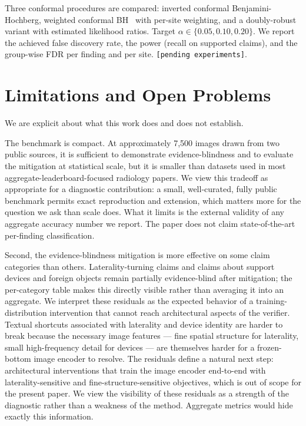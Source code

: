 \documentclass[11pt]{article}
\begin{document}
Three conformal procedures are compared: inverted conformal Benjamini-Hochberg, weighted conformal BH~\cite{tibshirani2019conformal} with per-site weighting, and a doubly-robust variant with estimated likelihood ratios. Target $\alpha \in \{0.05, 0.10, 0.20\}$. We report the achieved false discovery rate, the power (recall on supported claims), and the group-wise FDR per finding and per site. \texttt{[pending experiments]}.

\section{Limitations and Open Problems}
\label{sec:limitations}

We are explicit about what this work does and does not establish.

The benchmark is compact. At approximately 7{,}500 images drawn from two public sources, it is sufficient to demonstrate evidence-blindness and to evaluate the mitigation at statistical scale, but it is smaller than datasets used in most aggregate-leaderboard-focused radiology papers. We view this tradeoff as appropriate for a diagnostic contribution: a small, well-curated, fully public benchmark permits exact reproduction and extension, which matters more for the question we ask than scale does. What it limits is the external validity of any aggregate accuracy number we report. The paper does not claim state-of-the-art per-finding classification.

Second, the evidence-blindness mitigation is more effective on some claim categories than others. Laterality-turning claims and claims about support devices and foreign objects remain partially evidence-blind after mitigation; the per-category table makes this directly visible rather than averaging it into an aggregate. We interpret these residuals as the expected behavior of a training-distribution intervention that cannot reach architectural aspects of the verifier. Textual shortcuts associated with laterality and device identity are harder to break because the necessary image features --- fine spatial structure for laterality, small high-frequency detail for devices --- are themselves harder for a frozen-bottom image encoder to resolve. The residuals define a natural next step: architectural interventions that train the image encoder end-to-end with laterality-sensitive and fine-structure-sensitive objectives, which is out of scope for the present paper. We view the visibility of these residuals as a strength of the diagnostic rather than a weakness of the method. Aggregate metrics would hide exactly this information.
\end{document}
